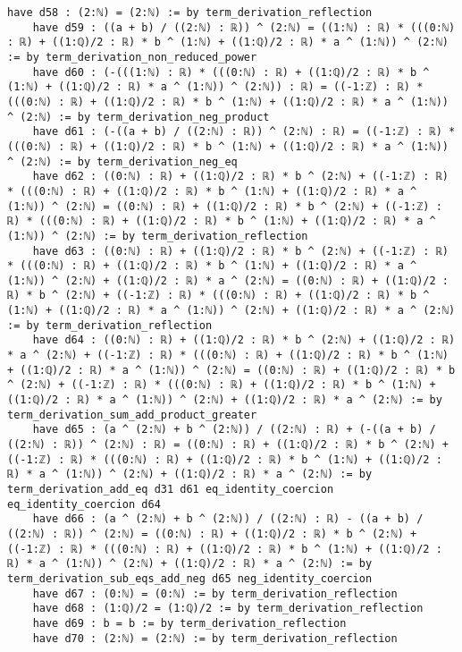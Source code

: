 \documentclass{article}
\begin{document}
\begin{tcolorbox}[colback=white!10, width=\linewidth]
\begin{lstlisting}[language=Lean4]
    have d58 : (2:ℕ) = (2:ℕ) := by term_derivation_reflection
    have d59 : ((a + b) / ((2:ℕ) : ℝ)) ^ (2:ℕ) = ((1:ℕ) : ℝ) * (((0:ℕ) : ℝ) + ((1:ℚ)/2 : ℝ) * b ^ (1:ℕ) + ((1:ℚ)/2 : ℝ) * a ^ (1:ℕ)) ^ (2:ℕ) := by term_derivation_non_reduced_power
    have d60 : (-(((1:ℕ) : ℝ) * (((0:ℕ) : ℝ) + ((1:ℚ)/2 : ℝ) * b ^ (1:ℕ) + ((1:ℚ)/2 : ℝ) * a ^ (1:ℕ)) ^ (2:ℕ)) : ℝ) = ((-1:ℤ) : ℝ) * (((0:ℕ) : ℝ) + ((1:ℚ)/2 : ℝ) * b ^ (1:ℕ) + ((1:ℚ)/2 : ℝ) * a ^ (1:ℕ)) ^ (2:ℕ) := by term_derivation_neg_product
    have d61 : (-((a + b) / ((2:ℕ) : ℝ)) ^ (2:ℕ) : ℝ) = ((-1:ℤ) : ℝ) * (((0:ℕ) : ℝ) + ((1:ℚ)/2 : ℝ) * b ^ (1:ℕ) + ((1:ℚ)/2 : ℝ) * a ^ (1:ℕ)) ^ (2:ℕ) := by term_derivation_neg_eq
    have d62 : ((0:ℕ) : ℝ) + ((1:ℚ)/2 : ℝ) * b ^ (2:ℕ) + ((-1:ℤ) : ℝ) * (((0:ℕ) : ℝ) + ((1:ℚ)/2 : ℝ) * b ^ (1:ℕ) + ((1:ℚ)/2 : ℝ) * a ^ (1:ℕ)) ^ (2:ℕ) = ((0:ℕ) : ℝ) + ((1:ℚ)/2 : ℝ) * b ^ (2:ℕ) + ((-1:ℤ) : ℝ) * (((0:ℕ) : ℝ) + ((1:ℚ)/2 : ℝ) * b ^ (1:ℕ) + ((1:ℚ)/2 : ℝ) * a ^ (1:ℕ)) ^ (2:ℕ) := by term_derivation_reflection
    have d63 : ((0:ℕ) : ℝ) + ((1:ℚ)/2 : ℝ) * b ^ (2:ℕ) + ((-1:ℤ) : ℝ) * (((0:ℕ) : ℝ) + ((1:ℚ)/2 : ℝ) * b ^ (1:ℕ) + ((1:ℚ)/2 : ℝ) * a ^ (1:ℕ)) ^ (2:ℕ) + ((1:ℚ)/2 : ℝ) * a ^ (2:ℕ) = ((0:ℕ) : ℝ) + ((1:ℚ)/2 : ℝ) * b ^ (2:ℕ) + ((-1:ℤ) : ℝ) * (((0:ℕ) : ℝ) + ((1:ℚ)/2 : ℝ) * b ^ (1:ℕ) + ((1:ℚ)/2 : ℝ) * a ^ (1:ℕ)) ^ (2:ℕ) + ((1:ℚ)/2 : ℝ) * a ^ (2:ℕ) := by term_derivation_reflection
    have d64 : ((0:ℕ) : ℝ) + ((1:ℚ)/2 : ℝ) * b ^ (2:ℕ) + ((1:ℚ)/2 : ℝ) * a ^ (2:ℕ) + ((-1:ℤ) : ℝ) * (((0:ℕ) : ℝ) + ((1:ℚ)/2 : ℝ) * b ^ (1:ℕ) + ((1:ℚ)/2 : ℝ) * a ^ (1:ℕ)) ^ (2:ℕ) = ((0:ℕ) : ℝ) + ((1:ℚ)/2 : ℝ) * b ^ (2:ℕ) + ((-1:ℤ) : ℝ) * (((0:ℕ) : ℝ) + ((1:ℚ)/2 : ℝ) * b ^ (1:ℕ) + ((1:ℚ)/2 : ℝ) * a ^ (1:ℕ)) ^ (2:ℕ) + ((1:ℚ)/2 : ℝ) * a ^ (2:ℕ) := by term_derivation_sum_add_product_greater
    have d65 : (a ^ (2:ℕ) + b ^ (2:ℕ)) / ((2:ℕ) : ℝ) + (-((a + b) / ((2:ℕ) : ℝ)) ^ (2:ℕ) : ℝ) = ((0:ℕ) : ℝ) + ((1:ℚ)/2 : ℝ) * b ^ (2:ℕ) + ((-1:ℤ) : ℝ) * (((0:ℕ) : ℝ) + ((1:ℚ)/2 : ℝ) * b ^ (1:ℕ) + ((1:ℚ)/2 : ℝ) * a ^ (1:ℕ)) ^ (2:ℕ) + ((1:ℚ)/2 : ℝ) * a ^ (2:ℕ) := by term_derivation_add_eq d31 d61 eq_identity_coercion eq_identity_coercion d64
    have d66 : (a ^ (2:ℕ) + b ^ (2:ℕ)) / ((2:ℕ) : ℝ) - ((a + b) / ((2:ℕ) : ℝ)) ^ (2:ℕ) = ((0:ℕ) : ℝ) + ((1:ℚ)/2 : ℝ) * b ^ (2:ℕ) + ((-1:ℤ) : ℝ) * (((0:ℕ) : ℝ) + ((1:ℚ)/2 : ℝ) * b ^ (1:ℕ) + ((1:ℚ)/2 : ℝ) * a ^ (1:ℕ)) ^ (2:ℕ) + ((1:ℚ)/2 : ℝ) * a ^ (2:ℕ) := by term_derivation_sub_eqs_add_neg d65 neg_identity_coercion
    have d67 : (0:ℕ) = (0:ℕ) := by term_derivation_reflection
    have d68 : (1:ℚ)/2 = (1:ℚ)/2 := by term_derivation_reflection
    have d69 : b = b := by term_derivation_reflection
    have d70 : (2:ℕ) = (2:ℕ) := by term_derivation_reflection

\end{lstlisting}
\end{tcolorbox}
\end{document}
